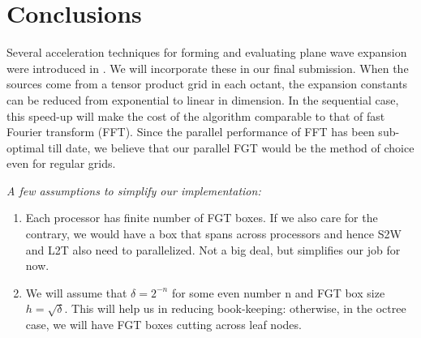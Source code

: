 \documentclass[conference]{IEEEtran}
\begin{document}
\section{Conclusions}

Several acceleration techniques for forming and evaluating plane wave expansion were introduced in \cite{fggt}. We will incorporate these in our final submission. When the sources come from a tensor product grid in each octant, the expansion constants can be reduced from exponential to linear in dimension. In the sequential case, this speed-up will make the cost of the algorithm comparable to that of fast Fourier transform (FFT). Since the parallel performance of FFT has been sub-optimal till date, we believe that our parallel FGT would be the method of choice even for regular grids. 


{\em
A few assumptions to simplify our implementation: 
\begin{enumerate}
\item Each processor has finite number of FGT boxes. If we also care for the contrary, we would have a box that spans across processors and hence S2W and L2T also need to parallelized. Not a big deal, but simplifies our job for now. 
\item We will assume that $\delta = 2^{-n}$ for some even number n and FGT box size $h = \sqrt{\delta}$. This will help us in reducing book-keeping: otherwise, in the octree case, we will have FGT boxes cutting across leaf nodes. 
\end{enumerate}
}




\end{document}
